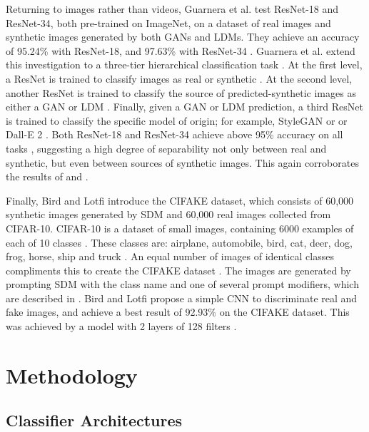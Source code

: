 Returning to images rather than videos, Guarnera et al. \cite{guarnera_2023} test ResNet-18 and ResNet-34, both pre-trained on ImageNet, on a dataset of real images and synthetic images generated by both GANs and LDMs. They achieve an accuracy of 95.24\% with ResNet-18, and 97.63\% with ResNet-34 \cite{guarnera_2023}. Guarnera et al. extend this investigation to a three-tier hierarchical classification task \cite{guarnera_2023}. At the first level, a ResNet is trained to classify images as real or synthetic \cite{guarnera_2023}. At the second level, another ResNet is trained to classify the source of predicted-synthetic images as either a GAN or LDM \cite{guarnera_2023}. Finally, given a GAN or LDM prediction, a third ResNet is trained to classify the specific model of origin; for example, StyleGAN or or Dall-E 2 \cite{guarnera_2023}. Both ResNet-18 and ResNet-34 achieve above 95\% accuracy on all tasks \cite{guarnera_2023}, suggesting a high degree of separability not only between real and synthetic, but even between sources of synthetic images. This again corroborates the results of \cite{corvi_2022} and \cite{sha_2023}.

Finally, Bird and Lotfi \cite{bird_2023} introduce the CIFAKE dataset, which consists of 60,000 synthetic images generated by SDM and 60,000 real images collected from CIFAR-10. CIFAR-10 is a dataset of small images, containing 6000 examples of each of 10 classes \cite{krizhevsky_2009}. These classes are: airplane, automobile, bird, cat, deer, dog, frog, horse, ship and truck \cite{krizhevsky_2009}. An equal number of images of identical classes compliments this to create the CIFAKE dataset \cite{bird_2023}. The images are generated by prompting SDM with the class name and one of several prompt modifiers, which are described in \cite{bird_2023}. Bird and Lotfi \cite{bird_2023} propose a simple CNN to discriminate real and fake images, and achieve a best result of 92.93\% on the CIFAKE dataset. This was achieved by a model with 2 layers of 128 filters \cite{bird_2023}.

\newpage
\section{Methodology}
\subsection{Classifier Architectures}

